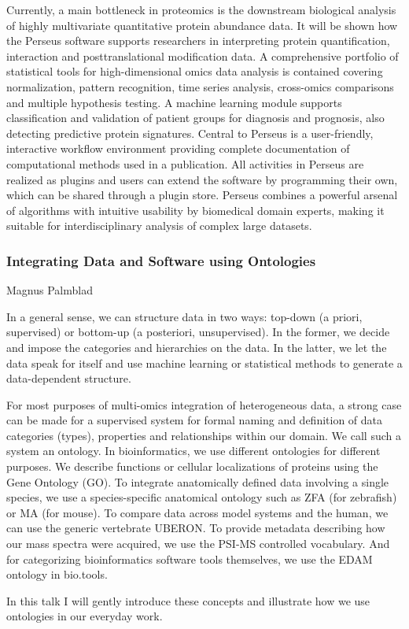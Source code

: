 Currently, a main bottleneck in proteomics is the downstream biological analysis
of highly multivariate quantitative protein abundance data. It will be shown how
the Perseus software supports researchers in interpreting protein
quantification, interaction and posttranslational modification data. A
comprehensive portfolio of statistical tools for high-dimensional omics data
analysis is contained covering normalization, pattern recognition, time series
analysis, cross-omics comparisons and multiple hypothesis testing. A machine
learning module supports classification and validation of patient groups for
diagnosis and prognosis, also detecting predictive protein signatures. Central
to Perseus is a user-friendly, interactive workflow environment providing
complete documentation of computational methods used in a publication. All
activities in Perseus are realized as plugins and users can extend the software
by programming their own, which can be shared through a plugin store. Perseus
combines a powerful arsenal of algorithms with intuitive usability by biomedical
domain experts, making it suitable for interdisciplinary analysis of complex
large datasets.


\subsubsection*{\color{eubicRed} Integrating Data and Software using Ontologies}
{\color{eubicGray}Magnus Palmblad}

In a general sense, we can structure data in two ways: top-down (a priori,
supervised) or bottom-up (a posteriori, unsupervised). In the former, we decide
and impose the categories and hierarchies on the data. In the latter, we let the
data speak for itself and use machine learning or statistical methods to
generate a data-dependent structure.

For most purposes of multi-omics integration of heterogeneous data, a strong
case can be made for a supervised system for formal naming and definition of
data categories (types), properties and relationships within our domain. We call
such a system an ontology. In bioinformatics, we use different ontologies for
different purposes. We describe functions or cellular localizations of proteins
using the Gene Ontology (GO). To integrate anatomically defined data involving a
single species, we use a species-specific anatomical ontology such as ZFA (for
zebrafish) or MA (for mouse). To compare data across model systems and the
human, we can use the generic vertebrate UBERON. To provide metadata describing
how our mass spectra were acquired, we use the PSI-MS controlled vocabulary. And
for categorizing bioinformatics software tools themselves, we use the EDAM
ontology in bio.tools.

In this talk I will gently introduce these concepts and illustrate how we use
ontologies in our everyday work.
